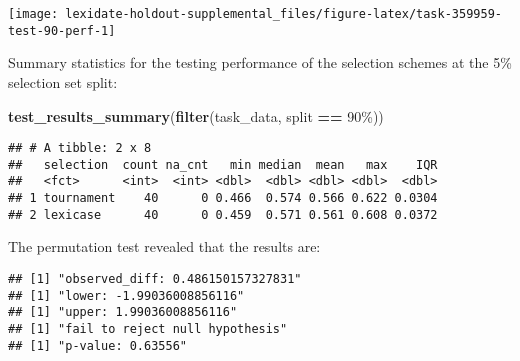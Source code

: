 \documentclass[
]{book}
\newenvironment{Shaded}{\begin{snugshade}}{\end{snugshade}}
\newcommand{\AttributeTok}[1]{\textcolor[rgb]{0.13,0.29,0.53}{#1}}
\newcommand{\DecValTok}[1]{\textcolor[rgb]{0.00,0.00,0.81}{#1}}
\newcommand{\FunctionTok}[1]{\textcolor[rgb]{0.13,0.29,0.53}{\textbf{#1}}}
\newcommand{\NormalTok}[1]{#1}
\newcommand{\OtherTok}[1]{\textcolor[rgb]{0.56,0.35,0.01}{#1}}
\newcommand{\SpecialCharTok}[1]{\textcolor[rgb]{0.81,0.36,0.00}{\textbf{#1}}}
\newcommand{\StringTok}[1]{\textcolor[rgb]{0.31,0.60,0.02}{#1}}
\begin{document}
\texttt{[image: lexidate-holdout-supplemental\_files/figure-latex/task-359959-test-90-perf-1]}

Summary statistics for the testing performance of the selection schemes at the 5\% selection set split:

\begin{Shaded}
\begin{Highlighting}[]
\FunctionTok{test\_results\_summary}\NormalTok{(}\FunctionTok{filter}\NormalTok{(task\_data, split }\SpecialCharTok{==} \StringTok{\textquotesingle{}90\%\textquotesingle{}}\NormalTok{))}
\end{Highlighting}
\end{Shaded}

\begin{verbatim}
## # A tibble: 2 x 8
##   selection  count na_cnt   min median  mean   max    IQR
##   <fct>      <int>  <int> <dbl>  <dbl> <dbl> <dbl>  <dbl>
## 1 tournament    40      0 0.466  0.574 0.566 0.622 0.0304
## 2 lexicase      40      0 0.459  0.571 0.561 0.608 0.0372
\end{verbatim}

The permutation test revealed that the results are:

\begin{Shaded}
\end{Shaded}

\begin{verbatim}
## [1] "observed_diff: 0.486150157327831"
## [1] "lower: -1.99036008856116"
## [1] "upper: 1.99036008856116"
## [1] "fail to reject null hypothesis"
## [1] "p-value: 0.63556"
\end{verbatim}
\end{document}
